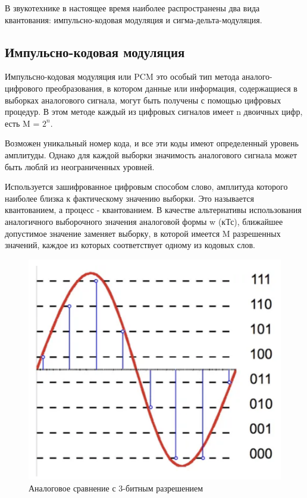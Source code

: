 \documentclass[12pt,a4paper,oneside]{report}
\begin{document}
В звукотехнике в настоящее время наиболее распространены два вида квантования: импульсно-кодовая модуляция и сигма-дельта-модуляция.
\subsection{Импульсно-кодовая модуляция}
\quad

Импульсно-кодовая модуляция или PCM это особый тип метода аналого-цифрового преобразования, в котором данные или информация, содержащиеся в выборках аналогового сигнала, могут быть получены с помощью цифровых процедур. В этом методе каждый из цифровых сигналов имеет n двоичных цифр, есть M = $2^n$\cite{ten}.

Возможен уникальный номер кода, и все эти коды имеют определенный уровень амплитуды. Однако для каждой выборки значимость аналогового сигнала может быть люблй из неограниченных уровней.

Используется зашифрованное цифровым способом слово, амплитуда которого наиболее близка к фактическому значению выборки. Это называется квантованием, а процесс - квантованием. В качестве альтернативы использования аналогичного выборочного значения аналоговой формы w (кТс), ближайшее допустимое значение заменяет выборку, в которой имеется M разрешенных значений, каждое из которых соответствует одному из кодовых слов.

\begin{figure}[!htbp]
	\centering
	\includegraphics[scale=0.7]{impcodemod.png}
	\caption{Аналоговое сравнение с 3-битным разрешением}
	\label{ris:impcodemod}
\end{figure}
\end{document}
